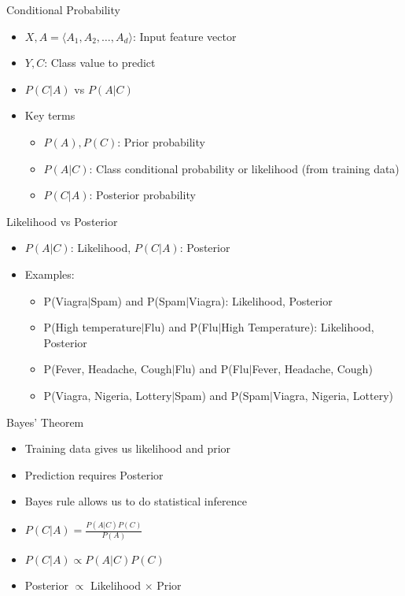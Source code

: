 \documentclass{beamer}
\begin{document}
\begin{frame}{Conditional Probability}
    \begin{itemize}
        \item $X, A =\langle A_1, A_2, \ldots, A_d \rangle$: Input feature vector
        \item $Y, C$: Class value to predict
        \item $P(C|A)$ vs $P(A|C)$ \pause
        \item Key terms
        \begin{itemize}
            \item $P(A), P(C)$: Prior probability
            \item $P(A|C)$: Class conditional probability or likelihood (from training data)
            \item $P(C|A)$: Posterior probability
        \end{itemize}
    \end{itemize}
\end{frame}

\begin{frame}{Likelihood vs Posterior}
    \begin{itemize}
        \item $P(A|C)$: Likelihood, $P(C|A)$: Posterior
        \item Examples:
        \begin{itemize}
            \item P(Viagra$|$Spam) and P(Spam$|$Viagra): \pause Likelihood, Posterior
            \item P(High temperature$|$Flu) and P(Flu$|$High Temperature): \pause Likelihood, Posterior
            \item P(Fever, Headache, Cough$|$Flu) and P(Flu$|$Fever, Headache, Cough)
            \item P(Viagra, Nigeria, Lottery$|$Spam) and P(Spam$|$Viagra, Nigeria, Lottery)
        \end{itemize}
    \end{itemize}
\end{frame}

\begin{frame}{Bayes' Theorem}
    \begin{itemize}
        \item Training data gives us likelihood and prior
        \item Prediction requires Posterior
        \item Bayes rule allows us to do statistical inference
        \item $P(C|A) = \frac{P(A|C) P(C)}{P(A)}$
        \item $P(C|A) \propto P(A|C) P(C)$
        \item Posterior $\propto$ Likelihood $\times$ Prior
    \end{itemize}
\end{frame}
\end{document}
